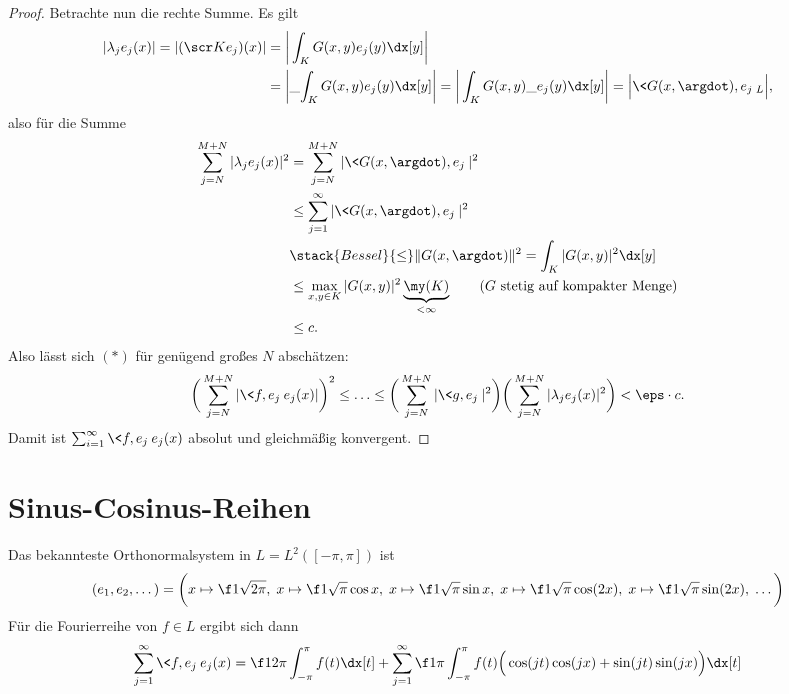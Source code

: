 \begin{st}
\begin{proof}
		Betrachte nun die rechte Summe.
		Es gilt
		\begin{align*}
			|\lambda_j e_j(x)|
			= |(\scr K e_j)(x)| 
			&= \bigg|\int_{K} G(x,y) e_j(y) \dx[y]\bigg|  \\
			&= \bigg|\_{\int_{K} G(x,y) e_j(y) \dx[y]}\bigg| 
			= \bigg|\int_{K} G(x,y) \_{e_j(y)} \dx[y]\bigg| 
			= \Big|\<G(x,\argdot), e_j \>_L \Big|,
		\end{align*}
		also für die Summe
		\begin{align*}
			\sum_{j=N}^{M+N} |\lambda_j e_j(x)|^2
			&= \sum_{j=N}^{M+N} |\<G(x,\argdot), e_j\>|^2 \\
			&\le \sum_{j=1}^\infty |\<G(x,\argdot), e_j\>|^2 \\
			&\stack{Bessel}{\le} \|G(x,\argdot)\|^2 
			= \int_K |G(x,y)|^2 \dx[y]\\
			&\le \max_{x,y \in K} |G(x,y)|^2 \underbrace{\my(K)}_{< \infty}  \qquad \text{($G$ stetig auf kompakter Menge)} \\
			&\le c.
		\end{align*}
		Also lässt sich $(*)$ für genügend großes $N$ abschätzen:
		\[
			\bigg( \sum_{j=N}^{M+N} |\<f,e_j\> e_j(x) | \bigg)^2
			\le \dotsc \le 
			\bigg( \sum_{j=N}^{M+N} |\<g,e_j\>|^2 \bigg) \bigg(\sum_{j=N}^{M+N}|\lambda_j e_j(x)|^2\bigg)
			< \eps \cdot c.
		\]
		Damit ist $\sum_{i=1}^\infty \<f,e_j\>e_j(x)$ absolut und gleichmäßig konvergent.
	\end{proof}
\end{st}


\section{Sinus-Cosinus-Reihen}

Das bekannteste Orthonormalsystem in $L = L^2([-\pi, \pi])$ ist
\begin{align*}
	(e_1, e_2, \dotsc ) = \bigg( x \mapsto \f 1{\sqrt{2\pi}},\; 
	x \mapsto \f 1{\sqrt \pi} \cos x,\; 
	x \mapsto \f 1{\sqrt \pi} \sin x, \;
	x \mapsto \f 1{\sqrt \pi} \cos(2x), \;
	x \mapsto \f 1{\sqrt \pi} \sin(2x),\; \dotsc \bigg)
\end{align*}
Für die Fourierreihe von $f \in L$ ergibt sich dann
\begin{align*}
	\sum_{j=1}^\infty \<f,e_j\> e_j(x)
	= \f 1{2\pi} \int_{-\pi}^{\pi} f(t) \dx[t] + \sum_{j=1}^\infty \f 1{\pi} \int_{-\pi}^{\pi} f(t) \Big( \cos(jt) \cos(jx) + \sin(jt) \sin(jx) \Big) \dx[t]
\end{align*}

